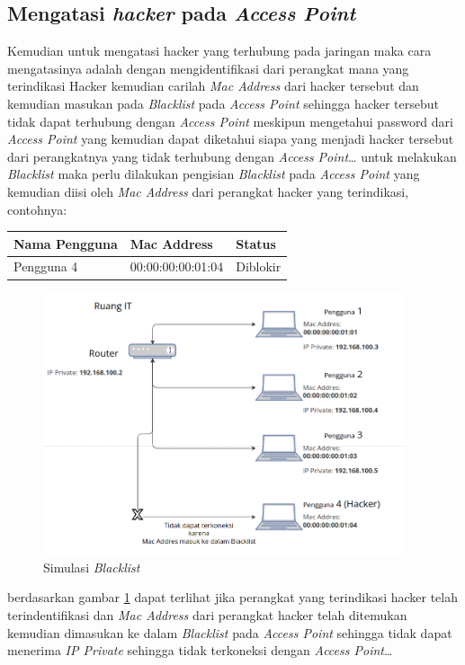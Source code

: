 \documentclass[a4paper, 12pt]{article}
\begin{document}
\subsection{Mengatasi \textit{hacker} pada \textit{Access Point}}
Kemudian untuk mengatasi hacker yang terhubung pada jaringan maka cara mengatasinya adalah dengan mengidentifikasi dari perangkat mana yang terindikasi Hacker kemudian carilah \textit{Mac Address} dari hacker tersebut dan kemudian masukan pada \textit{Blacklist} pada \textit{Access Point} sehingga hacker tersebut tidak dapat terhubung dengan \textit{Access Point} meskipun mengetahui password dari \textit{Access Point} yang kemudian dapat diketahui siapa yang menjadi hacker tersebut dari perangkatnya yang tidak terhubung dengan \textit{Access Point}\dots
untuk melakukan \textit{Blacklist} maka perlu dilakukan pengisian \textit{Blacklist} pada \textit{Access Point} yang kemudian diisi oleh \textit{Mac Address} dari perangkat hacker yang terindikasi, contohnya:
\begin{table}[H]
  \centering
  \begin{tabular}{|l|l|l|}
    \hline
    Nama Pengguna & Mac Address       & Status   \\ \hline
    Pengguna 4    & 00:00:00:00:01:04 & Diblokir \\ \hline
  \end{tabular}
\end{table}
\begin{figure}[H]
  \begin{center}
    \includegraphics[width=0.95\textwidth]{images/Gambar3_2.png}
  \end{center}
  \caption{Simulasi \textit{Blacklist}}\label{fig:hacker}
\end{figure}
berdasarkan gambar \ref{fig:hacker} dapat terlihat jika perangkat yang terindikasi hacker telah terindentifikasi dan \textit{Mac Address} dari perangkat hacker telah ditemukan kemudian dimasukan ke dalam \textit{Blacklist} pada \textit{Access Point} sehingga tidak dapat menerima \textit{IP Private} sehingga tidak terkoneksi dengan \textit{Access Point}\dots
\end{document}
